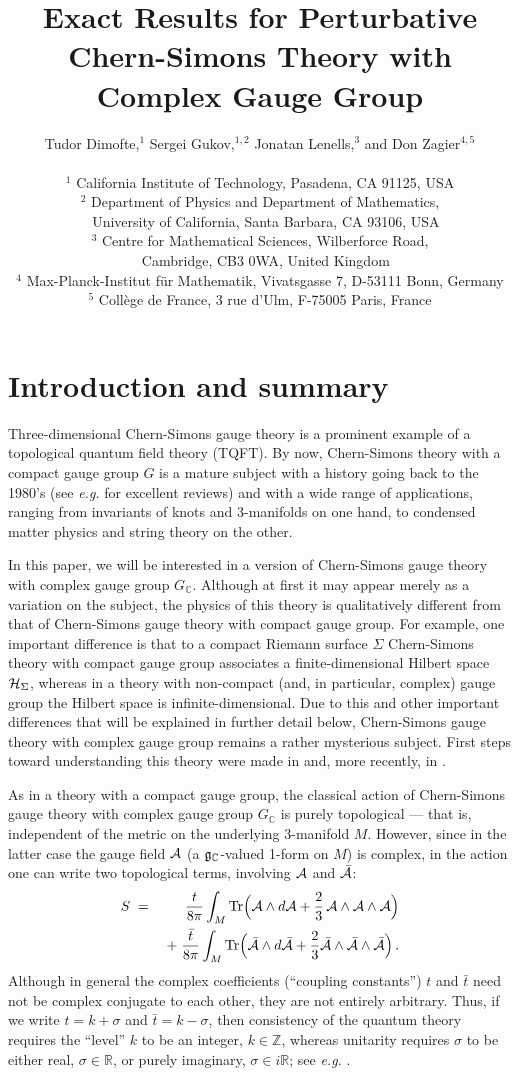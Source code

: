 \documentclass[hyper]{JHEP3}
\title{Exact Results for Perturbative Chern-Simons Theory with Complex Gauge Group}
\author{Tudor Dimofte,$^1$ Sergei Gukov,$^{1,2}$ Jonatan Lenells,$^3$ and Don Zagier$^{4,5}$
\\ ~
\\
$^1$ California Institute of Technology, Pasadena, CA 91125, USA \\
$^2$  Department of Physics and Department of Mathematics,\\
~ University of California, Santa Barbara, CA 93106, USA\\
$^3$ Centre for Mathematical Sciences, Wilberforce Road,\\
~ Cambridge, CB3 0WA, United Kingdom\\
$^4$ Max-Planck-Institut f\"ur Mathematik, Vivatsgasse 7, D-53111 Bonn, Germany\\
$^5$ Coll\`ege de France, 3 rue d'Ulm, F-75005 Paris, France}
\def\Tr{{\rm Tr}}
\def\CA {{\cal A}}
\def\CH {{\cal H}}
\newcommand{\C}{{\mathbb{C}}}
\newcommand{\R}{{\mathbb{R}}}
\newcommand{\Z}{{\mathbb{Z}}}
\newcommand{\bea}{\begin{eqnarray}}
\newcommand{\eea}{\end{eqnarray}}
\def\={\;=\;}
\begin{document}

\section{Introduction and summary}
\label{sec:intro}

Three-dimensional Chern-Simons gauge theory is a prominent example of
a topological quantum field theory (TQFT).
By now, Chern-Simons theory with a compact gauge group $G$
is a mature subject with a history going back to the 1980's
(see {\it e.g.} \cite{freed-2008,labastida-1999} for excellent reviews)
and with a wide range of applications,
ranging from invariants of knots and 3-manifolds \cite{witten-1989}
on one hand, to condensed matter physics \cite{heinonen-1998,murthy-2003}
and string theory \cite{marino-2004} on the other.

In this paper, we will be interested in a version of Chern-Simons
gauge theory with complex gauge group $G_{\C}$.
Although at first it may appear merely as a variation on the subject,
the physics of this theory is qualitatively different from that
of Chern-Simons gauge theory with compact gauge group.
For example, one important difference is that
to a compact Riemann surface $\Sigma$ Chern-Simons theory with compact
gauge group associates a finite-dimensional Hilbert space $\CH_{\Sigma}$,
whereas in a theory with non-compact (and, in particular, complex)
gauge group the Hilbert space is infinite-dimensional.
Due to this and other important differences that will be explained in further detail below,
Chern-Simons gauge theory with complex gauge group
remains a rather mysterious subject. First steps toward understanding
this theory were made in \cite{witten-1991} and, more recently, in \cite{gukov-2003}.

As in a theory with a compact gauge group, the classical action
of Chern-Simons gauge theory with complex gauge group $G_{\C}$
is purely topological --- that is, independent of the metric on the
underlying 3-manifold $M$.
However, since in the latter case the gauge field $\CA$
(a $\frak g_{\C}$-valued 1-form on $M$) is complex,
in the action one can write two topological terms,
involving $\CA$ and $\bar \CA$:
\bea
S & \= & {t \over 8 \pi}
\int_M \Tr
  \Big( \CA \wedge d\CA + \frac23\,\CA \wedge \CA \wedge \CA \Big) \label{csaction} \\
  & & +\;{\bar t \over 8 \pi} \int_M \Tr \Big( \bar \CA \wedge d \bar \CA
   + \frac23\bar \CA \wedge \bar \CA \wedge \bar \CA \Big)\,. \nonumber
\eea
Although in general the complex coefficients (``coupling constants'')
$t$ and $\bar t$ need not be complex conjugate to each other,
they are not entirely arbitrary.
Thus, if we write $t = k + \sigma$ and $\bar t = k - \sigma$,
then consistency of the quantum theory requires the ``level'' $k$
to be an integer, $k \in \Z$, whereas unitarity requires $\sigma$
to be either real, $\sigma \in \R$, or purely imaginary, $\sigma \in i \R$;
see {\it e.g.} \cite{witten-1991}.
\end{document}
